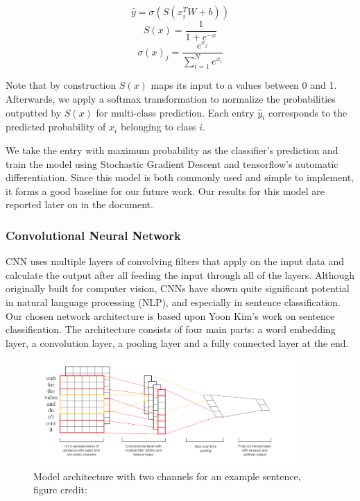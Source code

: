 \documentclass[conference]{IEEEtran}
\begin{document}
    $$\hat{y} = \sigma(S(x^T_i W +b))$$
    $$S(x) = \frac{1}{1+e^{-x}}$$
    $$\sigma (x)_{j}={\frac {e^{x_{j}}}{\sum _{i=1}^{N}e^{x_{i}}}}$$

    
    Note that by construction $S(x)$ maps its input to a values between 0 and 1.
    Afterwards, we apply a softmax transformation to normalize the probabilities outputted
    by $S(x)$ for multi-class prediction. Each entry $\hat{y}_i$ corresponds to the predicted
    probability of $x_i$ belonging to class $i$.
    
    We take the entry with maximum probability as the classifier's prediction and train the model using
    Stochastic Gradient Descent and tensorflow's automatic differentiation. Since this model is both
    commonly used and simple to implement, it forms a good baseline for our future work. Our results
    for this model are reported later on in the document.

\subsubsection{Convolutional Neural Network}
\label{model:core:cnn}
    CNN uses multiple layers of convolving filters that apply on the input data and
    calculate the output after all feeding the input through all of the layers. Although
    originally built for computer vision, CNNs have shown quite significant potential in
    natural language processing (NLP), and especially in sentence classification.
    Our chosen network architecture is based upon Yoon Kim's work on sentence
    classification\cite{kim2014convolutional}. The architecture consists of four 
    main parts: a word
    embedding layer, a convolution layer, a pooling layer and a fully connected layer
    at the end.
    \begin{figure}
    \center\includegraphics[width=0.9\textwidth]{figure/sc_model}
    \caption{Model architecture with two channels for an example sentence,
     figure credit: \cite{kim2014convolutional}}
    \end{figure}
\end{document}
